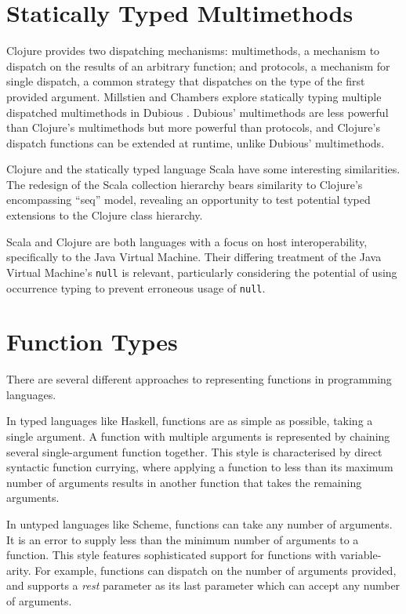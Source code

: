 \section{Statically Typed Multimethods}

Clojure provides two dispatching mechanisms: multimethods, a mechanism to dispatch on the
results of an arbitrary function; and protocols, a mechanism for single dispatch, a common
strategy that dispatches on the type of the first provided argument.
Millstien and Chambers explore statically typing multiple dispatched multimethods in Dubious \cite{MS02}.
Dubious' multimethods are less powerful than Clojure's multimethods but more powerful than protocols,
and Clojure's dispatch functions can be extended at runtime, unlike Dubious' multimethods.

Clojure and the statically typed language Scala \cite{OCD+} 
have some interesting similarities. The redesign
of the Scala collection hierarchy\cite{OS10}
bears similarity to Clojure's encompassing ``seq''
model, revealing an opportunity to test potential typed extensions to the Clojure 
class hierarchy. 

Scala and Clojure are both languages with a focus on host interoperability, specifically
to the Java Virtual Machine. Their differing treatment of the Java Virtual Machine's \lstinline|null| is
relevant, particularly considering the potential of using occurrence typing \cite{TF10}
to prevent erroneous usage of \lstinline|null|.

\section{Function Types}

There are several different approaches to representing functions in programming languages.

In typed languages like Haskell, functions are as simple as possible, taking a single argument.
A function with multiple arguments is represented by chaining several single-argument function
together. This style is characterised by direct syntactic function currying, where applying
a function to less than its maximum number of arguments results in another function
that takes the remaining arguments.

In untyped languages like Scheme, functions can take any number of arguments. It is an
error to supply less than the minimum number of arguments to a function.
This style features sophisticated support for functions with variable-arity. For example,
functions can dispatch on the number of arguments provided, and supports a \emph{rest} parameter
as its last parameter which can accept any number of arguments.

